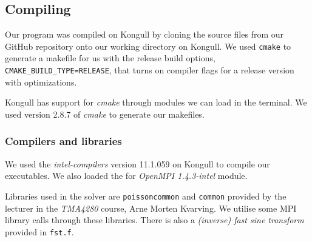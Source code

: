 \subsection{Compiling} %
\label{sub:compiling}
Our program was compiled on Kongull by cloning the source files from our GitHub repository onto our working directory on Kongull. We used \texttt{cmake} to generate a makefile for us with the release build options, \texttt{CMAKE\_BUILD\_TYPE=RELEASE}, that turns on compiler flags for a release version with optimizations.

Kongull has support for \emph{cmake} through modules we can load in the terminal. We used version 2.8.7 of \emph{cmake} to generate our makefiles.

\subsubsection{Compilers and libraries} %
\label{ssub:compilers}
We used the \emph{intel-compilers} version 11.1.059 on Kongull to compile our executables. We also loaded the for \emph{OpenMPI 1.4.3-intel} module.

Libraries used in the solver are \texttt{poissoncommon} and \texttt{common} provided by the lecturer in the \emph{TMA4280} course, Arne Morten Kvarving. We utilise some MPI library calls through these libraries. There is also a \emph{(inverse) fast sine transform} provided in \texttt{fst.f}.




